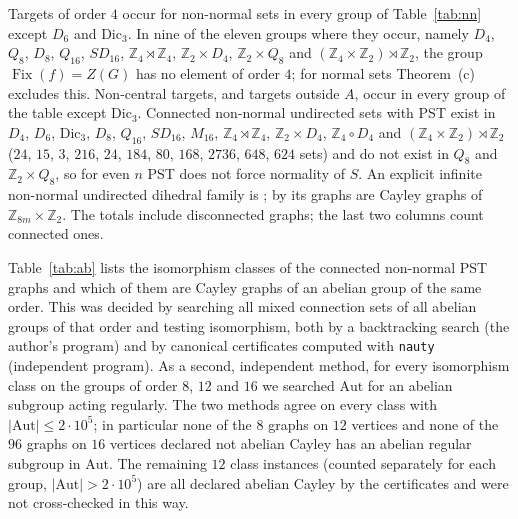 \documentclass[preprint,11pt]{elsarticle}
\makeatletter
\theoremstyle{definition}
\theoremstyle{remark}
\DeclareMathOperator{\Fix}{Fix}
\newcommand{\Z}{\mathbb Z}
\newcommand{\SR}[1]{\@nameuse{SR@#1}}
\makeatother
\begin{document}
Targets of order $4$ occur for non-normal sets in every group of Table~\ref{tab:nn} except $D_6$ and $\mathrm{Dic}_3$. In nine of the eleven groups where they occur, namely $D_4$, $Q_8$, $D_8$, $Q_{16}$, $SD_{16}$, $\Z_4\rtimes\Z_4$, $\Z_2\times D_4$, $\Z_2\times Q_8$ and $(\Z_4\times\Z_2)\rtimes\Z_2$, the group $\Fix(f)=Z(G)$ has no element of order $4$; for normal sets Theorem~\SR{thm:C}(c) excludes this. Non-central targets, and targets outside $A$, occur in every group of the table except $\mathrm{Dic}_3$. Connected non-normal undirected sets with PST exist in $D_4$, $D_6$, $\mathrm{Dic}_3$, $D_8$, $Q_{16}$, $SD_{16}$, $M_{16}$, $\Z_4\rtimes\Z_4$, $\Z_2\times D_4$, $\Z_4\circ D_4$ and $(\Z_4\times\Z_2)\rtimes\Z_2$ ($24$, $15$, $3$, $216$, $24$, $184$, $80$, $168$, $2736$, $648$, $624$ sets) and do not exist in $Q_8$ and $\Z_2\times Q_8$, so for even $n$ PST does not force normality of $S$. An explicit infinite non-normal undirected dihedral family is \cite[Example~5.1]{WangFeng}; by \cite[Example~5.11]{AG} its graphs are Cayley graphs of $\Z_{8m}\times\Z_2$. The totals include disconnected graphs; the last two columns count connected ones.

Table~\ref{tab:ab} lists the isomorphism classes of the connected non-normal PST graphs and which of them are Cayley graphs of an abelian group of the same order. This was decided by searching all mixed connection sets of all abelian groups of that order and testing isomorphism, both by a backtracking search (the author's program) and by canonical certificates computed with \texttt{nauty} (independent program). As a second, independent method, for every isomorphism class on the groups of order $8$, $12$ and $16$ we searched $\mathrm{Aut}$ for an abelian subgroup acting regularly. The two methods agree on every class with $|\mathrm{Aut}|\le2\cdot10^5$; in particular none of the $8$ graphs on $12$ vertices and none of the $96$ graphs on $16$ vertices declared not abelian Cayley has an abelian regular subgroup in $\mathrm{Aut}$. The remaining $12$ class instances (counted separately for each group, $|\mathrm{Aut}|>2\cdot10^5$) are all declared abelian Cayley by the certificates and were not cross-checked in this way.
\end{document}
